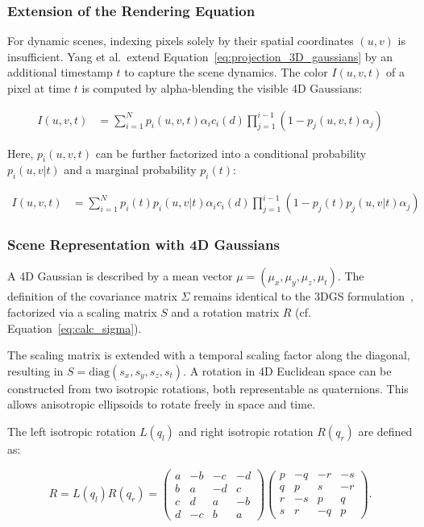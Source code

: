 \subsubsection{Extension of the Rendering Equation}

For dynamic scenes, indexing pixels solely by their spatial coordinates \((u,v)\) is insufficient. 
Yang et al.~extend Equation~\ref{eq:projection_3D_gaussians} by an additional timestamp \(t\) to capture the scene dynamics.  
The color \(I(u,v,t)\) of a pixel at time \(t\) is computed by alpha-blending the visible 4D Gaussians:

\begin{align}
I(u,v,t) &= \sum_{i=1}^N p_i(u,v,t) \alpha_i c_i(d) \prod_{j=1}^{i-1} (1 - p_j(u,v,t) \alpha_j)
\end{align}

Here, \(p_i(u,v,t)\) can be further factorized into a conditional probability \(p_i(u,v|t)\) and a marginal probability \(p_i(t)\):

\begin{align}
I(u,v,t) &= \sum_{i=1}^N p_i(t) p_i(u,v|t) \alpha_i c_i(d) \prod_{j=1}^{i-1} (1 - p_j(t) p_j(u,v|t) \alpha_j)
\end{align}

\subsubsection{Scene Representation with 4D Gaussians}

A 4D Gaussian is described by a mean vector \(\mu = (\mu_x, \mu_y, \mu_z, \mu_t)\). 
The definition of the covariance matrix \(\Sigma\) remains identical to the 3DGS formulation~\cite{kerbl3Dgaussians}, factorized via a scaling matrix \(S\) and a rotation matrix \(R\) (cf. Equation~\ref{eq:calc_sigma}).  

The scaling matrix is extended with a temporal scaling factor along the diagonal, resulting in \(S = \mathrm{diag}(s_x, s_y, s_z, s_t)\). 
A rotation in 4D Euclidean space can be constructed from two isotropic rotations, both representable as quaternions. 
This allows anisotropic ellipsoids to rotate freely in space and time.

The left isotropic rotation \(L(q_l)\) and right isotropic rotation \(R(q_r)\) are defined as:

\begin{equation}
R = L(q_l) R(q_r) = 
\begin{pmatrix} 
a & -b & -c & -d \\ 
b & a & -d & c \\
c & d & a & -b \\
d & -c & b & a
\end{pmatrix} 
\begin{pmatrix}
p & -q & -r & -s \\ 
q & p & s & -r \\ 
r & -s & p & q \\ 
s & r & -q & p
\end{pmatrix}.
\label{eq:rotation_matrix}
\end{equation}

